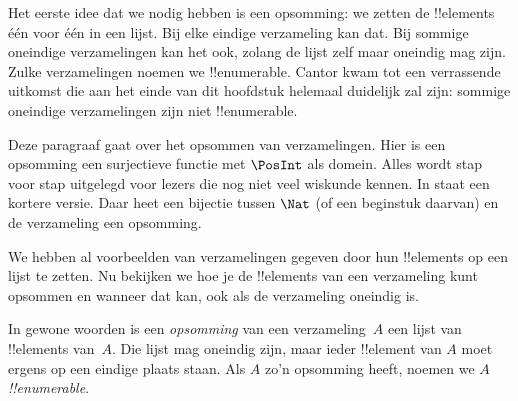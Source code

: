 \documentclass[openany]{memoir}
\begin{document}
Het eerste idee dat we nodig hebben is een opsomming: we zetten de
!!{element}s één voor één in een lijst. Bij elke eindige verzameling kan dat.
Bij sommige oneindige verzamelingen kan het ook, zolang de lijst zelf maar
oneindig mag zijn. Zulke verzamelingen noemen we !!{enumerable}. Cantor kwam
tot een verrassende uitkomst die aan het einde van dit hoofdstuk helemaal
duidelijk zal zijn: sommige oneindige verzamelingen zijn niet !!{enumerable}.
\endgroup

\begingroup
\def\olfilename{OLP-0029}
\def\olfilepath{content/sets-functions-relations/size-of-sets/}
\hypertarget{unit-OLP-0029}{}





\begin{editorial}
  Deze paragraaf gaat over het opsommen van verzamelingen. Hier is een
  opsomming een surjectieve functie met $\PosInt$ als domein. Alles wordt
  stap voor stap uitgelegd voor lezers die nog
  niet veel wiskunde kennen. In  staat een kortere
  versie. Daar heet een bijectie tussen $\Nat$ (of een beginstuk
  daarvan) en de verzameling een opsomming.
\end{editorial}

\begin{explain}
We hebben al voorbeelden van verzamelingen gegeven door hun
!!{element}s op een lijst te zetten. Nu bekijken we hoe je de
!!{element}s van een verzameling kunt opsommen en wanneer dat kan,
ook als de verzameling oneindig is.
\end{explain}

\begin{defn}
In gewone woorden is een \emph{opsomming} van een verzameling~$A$ een
lijst van !!{element}s van~$A$. Die lijst mag oneindig zijn, maar ieder
!!{element} van $A$ moet ergens op een eindige plaats staan. Als $A$
zo'n opsomming heeft, noemen we $A$ \emph{!!{enumerable}}.
\end{defn}
\end{document}
